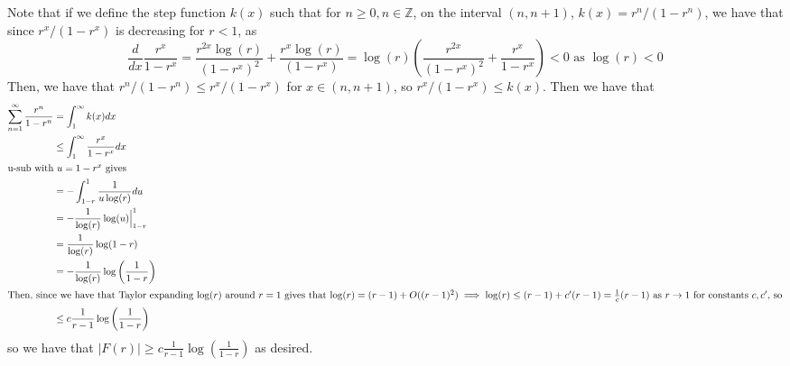 \documentclass[12pt,letterpaper]{article}
\theoremstyle{definition}
\newcommand{\Z}{\mathbb{Z}}
\begin{document}
Note that if we define the step function $k(x)$ such that for $n \geq 0, n \in \Z$, on the interval $(n,n+1)$, $k(x) = r^{n}/(1 - r^{n})$, we have that since $r^{x}/(1-r^{x})$ is decreasing for $r < 1$, as
\[
  \frac{d}{dx}\frac{r^{x}}{1-r^{x}} = \frac{r^{2x}\log(r)}{(1 - r^x)^2} + \frac{r^x \log(r)}{(1 - r^x)} = \log(r)\left(\frac{r^{2x}}{(1-r^{x})^{2}} + \frac{r^{x}}{1-r^{x}}\right) < 0 \text{ as } \log(r) < 0
\]
Then, we have that $r^{n}/(1-r^{n}) \leq r^{x}/(1-r^{x})$ for $x \in (n, n+1)$, so $r^{x}/(1-r^{x}) \leq k(x)$. Then we have that
\begin{align*}
  \sum_{n=1}^{\infty}\frac{r^{n}}{1-r^{n}} &= \int_{1}^{\infty}k(x)dx \\
                                           &\leq \int_{1}^{\infty}\frac{r^{x}}{1-r^{x}}dx \\
  \intertext{u-sub with $u = 1 - r^{x}$ gives}
                                           &= -\int_{1-r}^{1}\frac{1}{u\log(r)}du \\
                                           &= -\frac{1}{\log(r)}\log(u)\Big|_{1-r}^{1} \\
                                           &= \frac{1}{\log(r)}\log(1-r) \\
                                           &= -\frac{1}{\log(r)}\log\left(\frac{1}{1-r}\right) \\
  \intertext{Then, since we have that Taylor expanding $\log(r)$ around $r=1$ gives that $\log(r) = (r-1) + O((r-1)^{2}) \implies \log(r) \leq (r-1) + c'(r-1) = \frac{1}{c}(r-1)$ as $r \rightarrow 1$ for constants $c, c'$, so}
                                           &\leq c\frac{1}{r-1}\log\left(\frac{1}{1-r}\right)
\end{align*}
so we have that $|F(r)| \geq c\frac{1}{r-1}\log\left(\frac{1}{1-r}\right)$ as desired.
\end{document}
